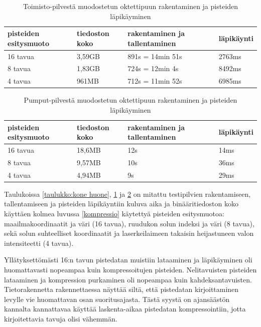 \begin{table}[h]
    \begin{tabular}{|l|l|l|l|}
    \hline
    \textbf{pisteiden esitysmuoto} & \textbf{tiedoston koko} & \textbf{rakentaminen ja tallentaminen} & \textbf{läpikäynti} \\ \hline
    16 tavua & 3,59GB              & 891s = 14min 51s              & 2763ms     \\
    8 tavua  & 1,83GB              & 724s = 12min 4s               & 8492ms     \\
    4 tavua & 961MB               & 712s = 11min 52s              & 6985ms     \\ \hline
    \end{tabular}
    \caption{Toimisto-pilvestä muodostetun oktettipuun rakentaminen ja pisteiden läpikäyminen}
    \label{taulukko:toimisto}
\end{table}

\begin{table}[h]
    \begin{tabular}{|l|l|l|l|}
    \hline
    \textbf{pisteiden esitysmuoto} & \textbf{tiedoston koko} & \textbf{rakentaminen ja tallentaminen} & \textbf{läpikäynti} \\ \hline
    16 tavua       & 18,6MB              & 12s                           & 14ms       \\ \hline
    8 tavua      & 9,57MB              & 10s                           & 36ms       \\ \hline
    4 tavua      & 4,94MB              & 9s                            & 29ms       \\ \hline
    \end{tabular}
    \caption{Pumput-pilvestä muodostetun oktettipuun rakentaminen ja pisteiden läpikäyminen}
    \label{taulukko:pumput}
\end{table}

Taulukoissa \ref{taulukko:kone  huone}, \ref{taulukko:toimisto} ja \ref{taulukko:pumput} on mitattu testipilvien rakentamiseen, tallentamiseen ja pisteiden läpikäyntiin kuluva aika ja binääritiedoston koko käyttäen kolmea luvussa \ref{kompressio} käytettyä pisteiden esitysmuotoa: maailmakoordinaatit ja väri (16 tavua), ruudukon solun indeksi ja väri (8 tavua), sekä solun suhteelliset koordinaatit ja laserkeilaimeen takaisin heijastuneen valon intensiteetti (4 tavua). 

Yllätyksettömästi 16:n tavun pistedatan muistiin lataaminen ja läpikäyminen oli huomattavasti nopeampaa kuin kompressoitujen pisteiden. Nelitavuisten pisteiden lataaminen ja kompression purkaminen oli nopeampaa kuin kahdeksantavuisten. Tietorakennetta rakennettaessa näyttää siltä, että pistedatan kirjoittaminen levylle vie huomattavan osan suoritusajasta. Tästä syystä on ajansäästön kannalta kannattavaa käyttää laskenta-aikaa pistedatan kompressointiin, jotta kirjoitettavia tavuja olisi vähemmän. 

